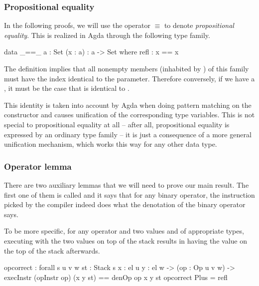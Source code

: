 
\subsubsection{Propositional equality}

In the following proofs, we will use the operator $\equiv$ to denote
\emph{propositional equality}. This is realized in Agda through the following
type family.

\begin{code}
  data _==_ {a : Set} (x : a) : a -> Set where
    refl : x == x
\end{code}

\noindent The definition implies that all nonempty members (inhabited by ) of this
family must have the index identical to the parameter.
Therefore conversely, if we have a , it must be the case that 
is identical to .

This identity is taken into account by Agda when doing pattern matching on the constructor
 and causes unification of the corresponding type variables. This is not special
to propositional equality at all -- after all, propositional equality is expressed by
an ordinary type family -- it is just a consequence of a more general unification mechanism,
which works this way for any other data type.

\subsubsection{Operator lemma}

There are two auxiliary lemmas that we will need to prove our main result. The
first one of them is called  and it says that for any binary
operator, the instruction picked by the compiler indeed does what the
denotation of the binary operator says.

To be more specific, for any operator  and two values  and
 of appropriate types, executing  with the two
values on top of the stack results in having the value 
on the top of the stack afterwards.

\label{sec:cor-op-correct}\begin{code}
  op\-correct : forall {s u v w} {st : Stack s} {x : el u} {y : el w}
    -> (op : Op u v w)
    -> execInstr (opInstr op) (x \scons y \scons st) == denOp op x y \scons st
  op\-correct Plus = refl
\end{code}

